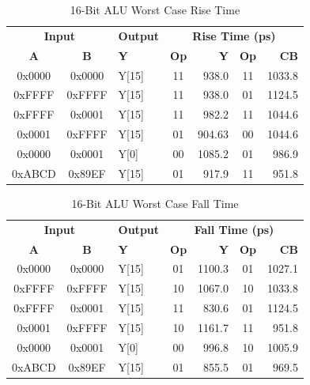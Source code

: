 \documentclass[11pt]{article}
\begin{document}
			\begin{table}[H]
				\centering
				\caption{16-Bit ALU Worst Case Rise Time}
				\label{tab:ALU-16-Bit-Risetime}
				\begin{tabular}{|cclcrcr|}
					\hline
					\multicolumn{2}{|c}{\textbf{Input}} & \textbf{Output} & \multicolumn{4}{c|}{\textbf{Rise Time (ps)}} \\
					\textbf{A} & \textbf{B} & \textbf{Y} & \textbf{Op} & \textbf{Y} & \textbf{Op} & \textbf{CB} \\
					\hline
					0x0000 & 0x0000 & Y{[}15{]} & 11 & 938.0 & 11 & 1033.8 \\
					0xFFFF & 0xFFFF & Y{[}15{]} & 11 & 938.0 & 01 & 1124.5 \\
					0xFFFF & 0x0001 & Y{[}15{]} & 11 & 982.2 & 11 & 1044.6 \\
					0x0001 & 0xFFFF & Y{[}15{]} & 01 & 904.63 & 00 & 1044.6 \\
					0x0000 & 0x0001 & Y{[}0{]} & 00 & 1085.2 & 01 & 986.9 \\
					0xABCD & 0x89EF & Y{[}15{]} & 01 & 917.9 & 11 & 951.8 \\
					\hline
				\end{tabular}
			\end{table}
		
		
			\begin{table}[H]
				\centering
				\caption{16-Bit ALU Worst Case Fall Time}
				\label{tab:ALU-16-Bit-Falltime}
				\begin{tabular}{|cclcrcr|}
					\hline
					\multicolumn{2}{|c}{\textbf{Input}} & \textbf{Output} & \multicolumn{4}{c|}{\textbf{Fall Time (ps)}} \\
					\textbf{A} & \textbf{B} & \textbf{Y} & \textbf{Op} & \textbf{Y} & \textbf{Op} & \textbf{CB} \\
					\hline
					0x0000 & 0x0000 & Y{[}15{]} & 01 & 1100.3 & 01 & 1027.1 \\
					0xFFFF & 0xFFFF & Y{[}15{]} & 10 & 1067.0 & 10 & 1033.8 \\
					0xFFFF & 0x0001 & Y{[}15{]} & 11 & 830.6 & 01 & 1124.5 \\
					0x0001 & 0xFFFF & Y{[}15{]} & 10 & 1161.7 & 11 & 951.8 \\
					0x0000 & 0x0001 & Y{[}0{]} & 00 & 996.8 & 10 & 1005.9 \\
					0xABCD & 0x89EF & Y{[}15{]} & 01 & 855.5 & 01 & 969.5 \\
					\hline
				\end{tabular}
			\end{table}
		
\end{document}
